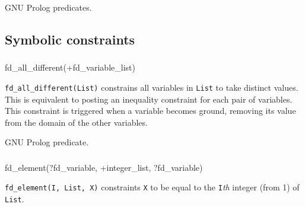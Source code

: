 \Portability

GNU Prolog predicates.

\subsection{Symbolic constraints}

\subsubsection{}

\begin{TemplatesOneCol}
fd\_all\_different(+fd\_variable\_list)

\end{TemplatesOneCol}

\Description

\texttt{fd\_all\_different(List)} constrains all variables in \texttt{List}
to take distinct values. This is equivalent to posting an inequality
constraint for each pair of variables. This constraint is triggered when a
variable becomes ground, removing its value from the domain of the other
variables.

\begin{PlErrors}




\end{PlErrors}

\Portability

GNU Prolog predicate.

\subsubsection{\label{fd-element/3}}

\begin{TemplatesOneCol}
fd\_element(?fd\_variable, +integer\_list, ?fd\_variable)

\end{TemplatesOneCol}

\Description

\texttt{fd\_element(I, List, X)} constraints \texttt{X} to be equal to the
\texttt{I}\emph{th} integer (from 1) of \texttt{List}.

